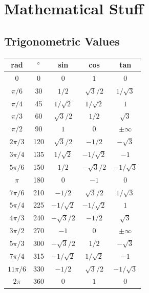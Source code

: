 \twocolumn
\chapter{Mathematical Stuff}
\section{Trigonometric Values}
    
\def\arraystretch{1.5}
\begin{tabular}{ |c|c|c|c|c| } 
\hline
\textbf{rad}	& \textbf{$^{\circ}$}	& \textbf{sin} 		& \textbf{cos} 	& \textbf{tan} 	\\ 
\hline
$ 0 $	 		& 0		& $0$ 			& $1$	 			& $0$ 							\\
\hline
$\pi/6 $ 		& 30	& $1/2$ 		& $\sqrt{3}/2 $ 	& $1/\sqrt{3}$ 					\\
\hline
$\pi/4 $ 		& 45	& $1/\sqrt{2}$ 	& $1/\sqrt{2} $ 	& $1$							\\
\hline
$\pi/3 $ 		& 60	& $\sqrt{3}/2$ 	& $ 1/2 $	 		& $\sqrt{3}$					\\
\hline
$\pi/2 $ 		& 90	& $1$ 			& $ 0 $ 			& $\pm\infty$					\\
\hline
$2\pi/3 $ 		& 120	& $\sqrt{3}/2$	& $ -1/2 $ 			& $-\sqrt{3}$					\\
\hline
$3\pi/4 $ 		& 135	& $1/\sqrt{2}$	& $ -1/\sqrt{2} $ 	& $-1$							\\
\hline
$5\pi/6 $ 		& 150	& $1/2$			& $ -\sqrt{3}/2 $ 	& $-1/\sqrt{3}$					\\
\hline
$\pi $ 			& 180	& $0$			& $ -1 $		 	& $0$							\\
\hline
$7\pi/6 $ 		& 210	& $-1/2$		& $ \sqrt{3}/2 $	& $1/\sqrt{3}$					\\
\hline
$5\pi/4 $ 		& 225	& $-1/\sqrt{2}$	& $ -1/\sqrt{2} $	& $1$							\\
\hline
$4\pi/3 $ 		& 240	& $-\sqrt{3}/2$	& $ -1/2 $			& $\sqrt{3}$					\\
\hline
$3\pi/2 $ 		& 270	& $-1$			& $ 0 $				& $\pm\infty$					\\
\hline
$5\pi/3 $ 		& 300	& $-\sqrt{3}/2$	& $ 1/2 $			& $-\sqrt{3}$					\\
\hline
$7\pi/4 $ 		& 315	& $-1/\sqrt{2}$	& $	1/\sqrt{2} $	& $-1$							\\
\hline
$11\pi/6 $ 		& 330	& $-1/2$		& $ \sqrt{3}/2 $	& $-1/\sqrt{3}$					\\
\hline
$2\pi $ 		& 360	& $0$			& $ 1 $		 		& $0$							\\
\hline
\end{tabular}      
                   
